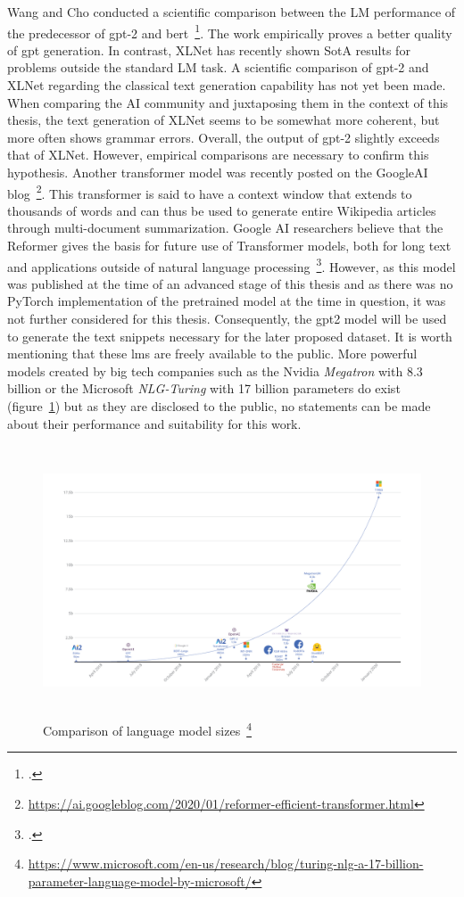 Wang and Cho conducted a scientific comparison between the LM performance of the predecessor of \gls{gpt}-2 and \gls{bert}~\footcite{wang2019bert}. The work empirically proves a better quality of \gls{gpt} generation. In contrast, XLNet has recently shown SotA results for problems outside the standard LM task. A scientific comparison of \gls{gpt}-2 and XLNet regarding the classical text generation capability has not yet been made. When comparing the AI community and juxtaposing them in the context of this thesis, the text generation of XLNet seems to be somewhat more coherent, but more often shows grammar errors. Overall, the output of \gls{gpt}-2 slightly exceeds that of XLNet. However, empirical comparisons are necessary to confirm this hypothesis. Another transformer model was recently posted on the GoogleAI blog~\footnote{\url{https://ai.googleblog.com/2020/01/reformer-efficient-transformer.html}}. This transformer is said to have a context window that extends to thousands of words and can thus be used to generate entire Wikipedia articles through multi-document summarization. Google AI researchers believe that the Reformer gives the basis for future use of Transformer models, both for long text and applications outside of natural language processing~\footcite{kitaev2020reformer}. However, as this model was published at the time of an advanced stage of this thesis and as there was no PyTorch implementation of the pretrained model at the time in question, it was not further considered for this thesis. Consequently, the \gls{gpt2} model will be used to generate the text snippets necessary for the later proposed dataset. It is worth mentioning that these \gls{lm}s are freely available to the public. More powerful models created by big tech companies such as the Nvidia \textit{Megatron} with 8.3 billion or the Microsoft \textit{NLG-Turing} with 17 billion parameters do exist (figure~\ref{fig:lm_model_comparison}) but as they are disclosed to the public, no statements can be made about their performance and suitability for this work.
\begin{figure}[h]
  	\includegraphics[height=8cm]{img/lm_model_comparison}
  	\caption[Comparison of language model sizes]{Comparison of language model sizes~\footnote{\url{https://www.microsoft.com/en-us/research/blog/turing-nlg-a-17-billion-parameter-language-model-by-microsoft/}}}
	\label{fig:lm_model_comparison}
\end{figure}
